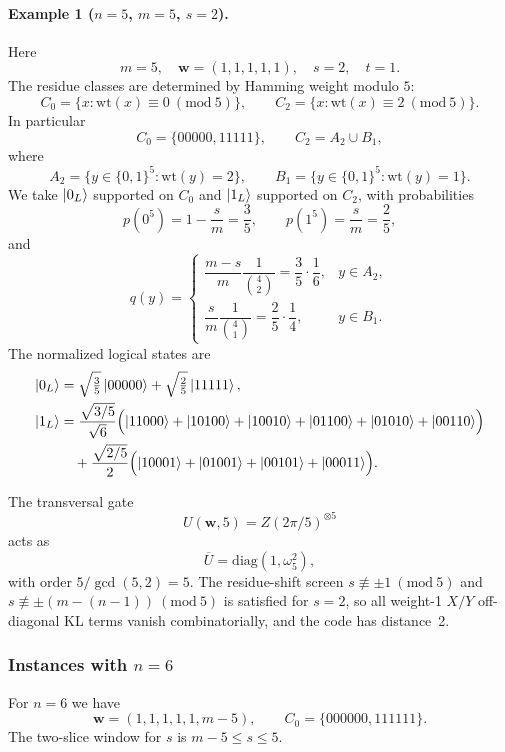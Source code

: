 \documentclass[pdflatex,sn-nature]{sn-jnl}%
\theoremstyle{thmstyleone}%
\theoremstyle{thmstyletwo}%
\theoremstyle{thmstylethree}%
\begin{document}
\begin{appendices}
\paragraph{Example 1 ($n=5$, $m=5$, $s=2$).}
Here
\[
  m=5,\quad \mathbf w=(1,1,1,1,1),\quad s=2,\quad t=1.
\]
The residue classes are determined by Hamming weight modulo $5$:
\[
  C_0=\{x:\mathrm{wt}(x)\equiv 0\ (\mathrm{mod}\ 5)\},\qquad
  C_2=\{x:\mathrm{wt}(x)\equiv 2\ (\mathrm{mod}\ 5)\}.
\]
In particular
\[
  C_0=\{00000,11111\},\qquad
  C_2=A_2\cup B_1,
\]
where
\[
  A_2=\{y\in\{0,1\}^5 : \mathrm{wt}(y)=2\},\qquad
  B_1=\{y\in\{0,1\}^5 : \mathrm{wt}(y)=1\}.
\]
We take $\ket{0_L}$ supported on $C_0$ and $\ket{1_L}$ supported on $C_2$, with probabilities
\[
  p(0^5)=1-\frac{s}{m}=\frac{3}{5},\qquad
  p(1^5)=\frac{s}{m}=\frac{2}{5},
\]
and
\[
  q(y)=
  \begin{cases}
    \dfrac{m-s}{m}\dfrac{1}{\binom{4}{2}}=\dfrac{3}{5}\cdot \dfrac{1}{6}, & y\in A_2,\\[4pt]
    \dfrac{s}{m}\dfrac{1}{\binom{4}{1}}=\dfrac{2}{5}\cdot \dfrac{1}{4},   & y\in B_1.
  \end{cases}
\]
The normalized logical states are
\begin{align}
  \ket{0_L}
    &=\sqrt{\tfrac{3}{5}}\ket{00000}+\sqrt{\tfrac{2}{5}}\ket{11111}, \notag\\
  \ket{1_L}
    &=\frac{\sqrt{3/5}}{\sqrt{6}}\Bigl(
        \ket{11000}+\ket{10100}+\ket{10010}
       +\ket{01100}+\ket{01010}+\ket{00110}
      \Bigr) \notag\\
    &\quad +\frac{\sqrt{2/5}}{2}\Bigl(
        \ket{10001}+\ket{01001}+\ket{00101}+\ket{00011}
      \Bigr). \notag
\end{align}

The transversal gate
\[
  U(\mathbf w,5)=Z(2\pi/5)^{\otimes 5}
\]
acts as
\[
  \overline U=\mathrm{diag}(1,\omega_5^2),
\]
with order $5/\gcd(5,2)=5$. The residue-shift screen
$s\not\equiv \pm1\ (\mathrm{mod}\ 5)$ and
$s\not\equiv \pm(m-(n-1))\ (\mathrm{mod}\ 5)$ is satisfied for $s=2$, so all weight-1 $X/Y$ off-diagonal KL terms vanish combinatorially, and the code has distance~2.

\subsubsection{Instances with $n=6$}

For $n=6$ we have
\[
  \mathbf w=(1,1,1,1,1,m-5),\qquad
  C_0=\{000000,111111\}.
\]
The two-slice window for $s$ is
$m-5\le s\le 5$.


\end{appendices}
\end{document}
